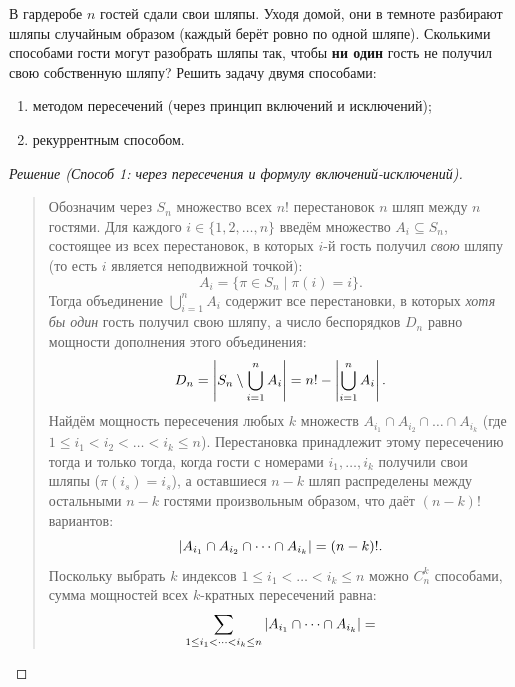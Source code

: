 \begin{problem}
    В гардеробе $n$ гостей сдали свои шляпы. Уходя домой, они в темноте 
    разбирают шляпы случайным образом (каждый берёт ровно по одной шляпе). 
    Сколькими способами гости могут разобрать шляпы так, чтобы \textbf{ни 
    один} гость не получил свою собственную шляпу? Решить задачу двумя 
    способами:
    \begin{enumerate}
        \item методом пересечений (через принцип включений и исключений);
        \item рекуррентным способом.
    \end{enumerate}
\end{problem}

\begin{proof}[Решение (Способ 1: через пересечения и формулу включений-исключений)]~\\
    \begin{quote}
        Обозначим через $S_n$ множество всех $n!$ перестановок $n$ шляп 
        между $n$ гостями. Для каждого $i \in \{1, 2, \dots, n\}$ введём 
        множество $A_i \subseteq S_n$, состоящее из всех перестановок, в 
        которых $i$-й гость получил \emph{свою} шляпу (то есть $i$ является 
        неподвижной точкой):
        \[
            A_i = \{\pi \in S_n \mid \pi(i) = i\}.
        \]
        Тогда объединение $\bigcup_{i=1}^n A_i$ содержит все перестановки, 
        в которых \emph{хотя бы один} гость получил свою шляпу, а число 
        беспорядков $D_n$ равно мощности дополнения этого объединения:
        \[
            D_n = \left| S_n \setminus \bigcup_{i=1}^{n} A_i \right| = 
            n! - \left| \bigcup_{i=1}^{n} A_i \right|.
        \]
        Найдём мощность пересечения любых $k$ множеств 
        $A_{i_1} \cap A_{i_2} \cap \dots \cap A_{i_k}$ (где 
        $1 \le i_1 < i_2 < \dots < i_k \le n$). Перестановка принадлежит 
        этому пересечению тогда и только тогда, когда гости с номерами 
        $i_1, \dots, i_k$ получили свои шляпы ($\pi(i_s) = i_s$), а 
        оставшиеся $n - k$ шляп распределены между остальными $n - k$ 
        гостями произвольным образом, что даёт $(n - k)!$ вариантов:
        \[
            \left| A_{i_1} \cap A_{i_2} \cap \dots \cap A_{i_k} \right| = (n - k)!.
        \]
        Поскольку выбрать $k$ индексов $1 \le i_1 < \dots < i_k \le n$ 
        можно $C_n^k$ способами, сумма мощностей всех $k$-кратных 
        пересечений равна:
        \[
            \sum_{1 \le i_1 < \dots < i_k \le n} 
            \left| A_{i_1} \cap \dots \cap A_{i_k} \right| = 
\]
\end{quote}
\end{proof}
